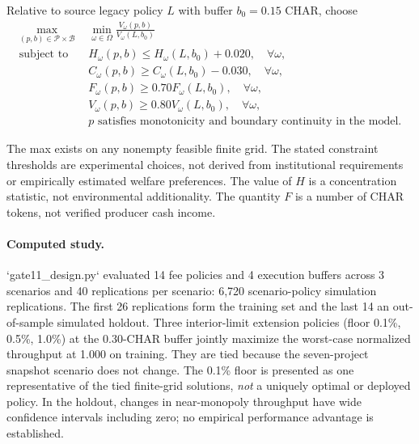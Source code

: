 \documentclass[11pt]{article}
\begin{document}
Relative to source legacy policy $L$ with buffer $b_0=0.15$ CHAR, choose
\begin{align}
\max_{(p,b)\in\mathcal{P}\times\mathcal{B}}\;&\min_{\omega\in\Omega}\frac{V_\omega(p,b)}{V_\omega(L,b_0)}\\
\text{subject to}\quad& H_\omega(p,b)\le H_\omega(L,b_0)+0.020,\quad\forall \omega,\\
& C_\omega(p,b)\ge C_\omega(L,b_0)-0.030,\quad\forall \omega,\\
& F_\omega(p,b)\ge0.70F_\omega(L,b_0),\quad\forall \omega,\\
& V_\omega(p,b)\ge0.80V_\omega(L,b_0),\quad\forall \omega,\\
& p\text{ satisfies monotonicity and boundary continuity in the model.}
\end{align}

The max exists on any nonempty feasible finite grid. The stated constraint thresholds are experimental choices, not derived from institutional requirements or empirically estimated welfare preferences. The value of $H$ is a concentration statistic, not environmental additionality. The quantity $F$ is a number of CHAR tokens, not verified producer cash income.

\paragraph{Computed study.}
`gate11_design.py` evaluated 14 fee policies and 4 execution buffers across 3 scenarios and 40 replications per scenario: 6,720 scenario-policy simulation replications. The first 26 replications form the training set and the last 14 an out-of-sample simulated holdout. Three interior-limit extension policies (floor 0.1\%, 0.5\%, 1.0\%) at the 0.30-CHAR buffer jointly maximize the worst-case normalized throughput at 1.000 on training. They are tied because the seven-project snapshot scenario does not change. The 0.1\% floor is presented as one representative of the tied finite-grid solutions, \emph{not} a uniquely optimal or deployed policy. In the holdout, changes in near-monopoly throughput have wide confidence intervals including zero; no empirical performance advantage is established.
\end{document}
